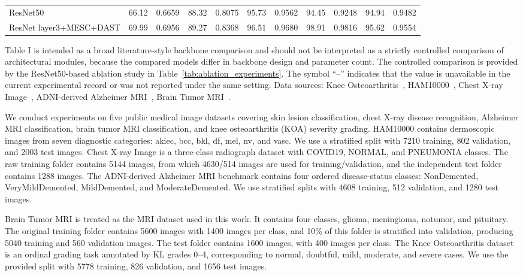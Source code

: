 \documentclass[runningheads]{llncs}
\begin{document}
\begin{table}[H]
{\begin{tabular}{lcccccccccc}
    ResNet50 & 66.12 & 0.6659 & 88.32 & 0.8075 & 95.73 & 0.9562 & 94.45 & 0.9248 & 94.94 & 0.9482 \\
    ResNet layer3+MESC+DAST & 69.99 & 0.6956 & 89.27 & 0.8368 & 96.51 & 0.9680 & 98.91 & 0.9816 & 95.62 & 0.9554 \\
    \bottomrule
\end{tabular}
    }
    \vspace{0.2em}
    \begin{minipage}{0.98\textwidth}
    \footnotesize Table I is intended as a broad literature-style backbone comparison and should not be interpreted as a strictly controlled comparison of architectural modules, because the compared models differ in backbone design and parameter count. The controlled comparison is provided by the ResNet50-based ablation study in Table~\ref{tab:ablation_experiments}. The symbol ``--'' indicates that the value is unavailable in the current experimental record or was not reported under the same setting. Data sources: Knee Osteoarthritis~\cite{28}, HAM10000~\cite{40}, Chest X-ray Image~\cite{29,30}, ADNI-derived Alzheimer MRI~\cite{31,32,33,34}, Brain Tumor MRI~\cite{35,36,37,38,39}.
    \end{minipage}
\end{table}
We conduct experiments on five public medical image datasets covering skin lesion classification, chest X-ray disease recognition, Alzheimer MRI classification, brain tumor MRI classification, and knee osteoarthritis (KOA) severity grading. HAM10000 contains dermoscopic images from seven diagnostic categories: akiec, bcc, bkl, df, mel, nv, and vasc. We use a stratified split with 7210 training, 802 validation, and 2003 test images. Chest X-ray Image is a three-class radiograph dataset with COVID19, NORMAL, and PNEUMONIA classes. The raw training folder contains 5144 images, from which 4630/514 images are used for training/validation, and the independent test folder contains 1288 images. The ADNI-derived Alzheimer MRI benchmark contains four ordered disease-status classes: NonDemented, VeryMildDemented, MildDemented, and ModerateDemented. We use stratified splits with 4608 training, 512 validation, and 1280 test images.

Brain Tumor MRI is treated as the MRI dataset used in this work. It contains four classes, glioma, meningioma, notumor, and pituitary. The original training folder contains 5600 images with 1400 images per class, and 10\% of this folder is stratified into validation, producing 5040 training and 560 validation images. The test folder contains 1600 images, with 400 images per class. The Knee Osteoarthritis dataset is an ordinal grading task annotated by KL grades 0--4, corresponding to normal, doubtful, mild, moderate, and severe cases. We use the provided split with 5778 training, 826 validation, and 1656 test images.
\end{document}
